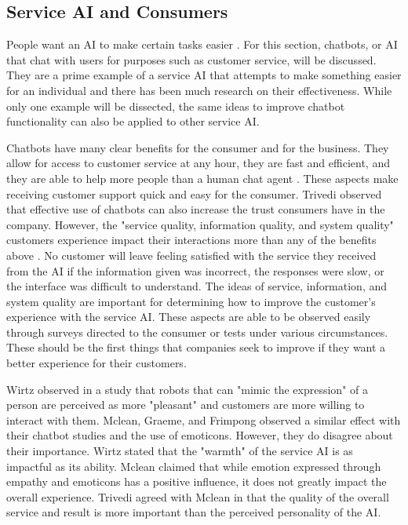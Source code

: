 \documentclass[12pt, man]{apa6}
\begin{document}
\subsection*{Service AI and Consumers}
People want an AI to make certain tasks easier \parencite{Trivedi201991}.  For this section, chatbots, or AI that chat with users for purposes such as customer service, will be discussed.  They are a prime example of a service AI that attempts to make something easier for an individual and there has been much research on their effectiveness.  While only one example will be dissected, the same ideas to improve chatbot functionality can also be applied to other service AI.

Chatbots have many clear benefits for the consumer and for the business.  They allow for access to customer service at any hour, they are fast and efficient, and they are able to help more people than a human chat agent \parencite{McLean2017494}. These aspects make receiving customer support quick and easy for the consumer.  Trivedi \parencite*{Trivedi201991} observed that effective use of chatbots can also increase the trust consumers have in the company.  However, the "service quality, information quality, and system quality" customers experience impact their interactions more than any of the benefits above \parencite{McLean2017494}.  No customer will leave feeling satisfied with the service they received from the AI if the information given was incorrect, the responses were slow, or the interface was difficult to understand.  The ideas of service, information, and system quality are important for determining how to improve the customer's experience with the service AI.  These aspects are able to be observed easily through surveys directed to the consumer or tests under various circumstances.  These should be the first things that companies seek to improve if they want a better experience for their customers.

Wirtz \parencite*{Wirtz2018} observed in a study that robots that can "mimic the expression" of a person are perceived as more "pleasant" and customers are more willing to interact with them.  Mclean, Graeme, and Frimpong \parencite*{McLean2017494} observed a similar effect with their chatbot studies and the use of emoticons.  However, they do disagree about their importance.  Wirtz \parencite*[]{Wirtz2018} stated that the "warmth" of the service AI is as impactful as its ability.  Mclean \parencite*[]{McLean2017494} claimed that while emotion expressed through empathy and emoticons has a positive influence, it does not greatly impact the overall experience.  Trivedi \parencite*{Trivedi201991} agreed with Mclean in that the quality of the overall service and result is more important than the perceived personality of the AI.
\end{document}
